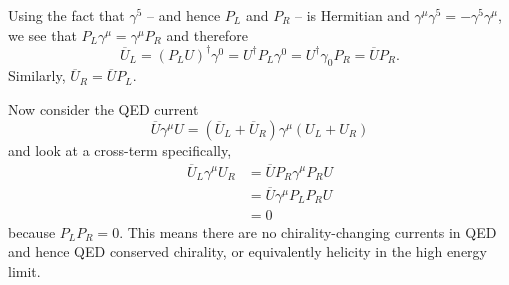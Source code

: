 Using the fact that $\gamma^5$ -- and hence $P_L$ and $P_R$ -- is Hermitian and $\gamma^\mu \gamma^5 = -\gamma^5 \gamma^\mu$, we see that $P_L\gamma^\mu = \gamma^\mu P_R$ and therefore
\begin{equation}
\overline{U}_L = (P_L U)^\dagger \gamma^0 = U^\dagger P_L \gamma^0 = U^\dagger \gamma_0 P_R = \overline{U} P_R.
\end{equation}
Similarly, $\overline{U}_R = \overline{U}P_L$.

Now consider the QED current
\begin{equation}
\overline{U}\gamma^\mu{U} = (\overline{U}_L + \overline{U}_R)\gamma^\mu(U_L + U_R)
\end{equation}
and look at a cross-term specifically,
\begin{align}
\overline{U}_L \gamma^\mu U_R &= \overline{U} P_R \gamma^\mu P_R U \nonumber \\
&= \overline{U} \gamma^\mu P_L P_R U \nonumber \\
&= 0\end{align}
because $P_LP_R=0$. This means there are no chirality-changing currents in QED and hence QED conserved chirality, or equivalently helicity in the high energy limit.
